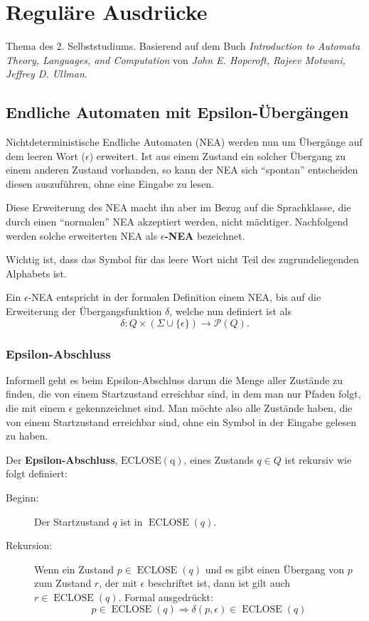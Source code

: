 \chapter{Reguläre Ausdrücke}
Thema des 2. Selbststudiums. Basierend auf dem Buch \textit{Introduction to Automata Theory, Languages, and Computation} von \textit{John E. Hopcroft, Rajeev Motwani, Jeffrey D. Ullman}.


\section{Endliche Automaten mit Epsilon-Übergängen}
Nichtdeterministische Endliche Automaten (NEA) werden nun um Übergänge auf dem leeren Wort (\(\epsilon\)) erweitert. Ist aus einem Zustand ein solcher Übergang zu einem anderen Zustand vorhanden, so kann der NEA sich ``spontan'' entscheiden diesen auszuführen, ohne eine Eingabe zu lesen.

Diese Erweiterung des NEA macht ihn aber im Bezug auf die Sprachklasse, die durch einen ``normalen'' NEA akzeptiert werden, nicht mächtiger. Nachfolgend werden solche erweiterten NEA als \textbf{\(\epsilon\)-NEA} bezeichnet.

Wichtig ist, dass das Symbol für das leere Wort nicht Teil des zugrundeliegenden Alphabets ist.

Ein \(\epsilon\)-NEA entspricht in der formalen Definition einem NEA, bis auf die Erweiterung der Übergangsfunktion \(\delta\), welche nun definiert ist als
\[
\delta: Q \times (\Sigma \cup \{\epsilon\}) \to \mathcal{P}(Q).
\]

\subsection{Epsilon-Abschluss}
Informell geht es beim Epsilon-Abschluss darum die Menge aller Zustände zu finden, die von einem Startzustand erreichbar sind, in dem man nur Pfaden folgt, die mit einem \(\epsilon\) gekennzeichnet sind. Man möchte also alle Zustände haben, die von einem Startzustand erreichbar sind, ohne ein Symbol in der Eingabe gelesen zu haben.\\

\begin{definition}
Der \textbf{Epsilon-Abschluss}, \(\operatorname{ECLOSE(q)}\), eines Zustands \(q \in Q\) ist rekursiv wie folgt definiert:
\begin{description}
  \item [Beginn:] Der Startzustand \(q\) ist in \(\operatorname{ECLOSE}(q)\).
  \item [Rekursion:] Wenn ein Zustand \(p \in \operatorname{ECLOSE}(q)\) und es gibt einen Übergang von \(p\) zum Zustand \(r\), der mit \(\epsilon\) beschriftet ist, dann ist gilt auch \(r \in \operatorname{ECLOSE}(q)\). Formal ausgedrückt: \[p \in \operatorname{ECLOSE}(q) \Rightarrow \delta(p, \epsilon) \in \operatorname{ECLOSE}(q)\]
\end{description}
\end{definition}

